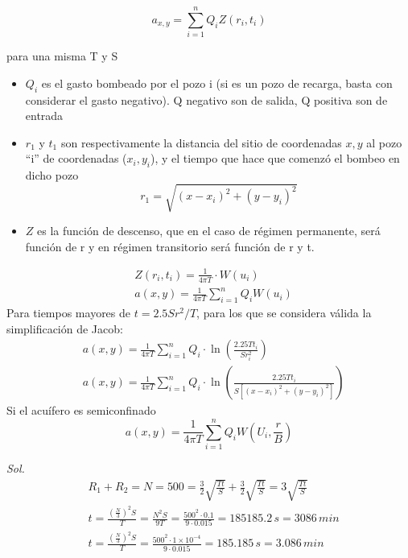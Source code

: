 \begin{equation}
    a_{x,y}= \sum_{i = 1}^{n} Q_iZ\left(r_i,t_i\right)
\end{equation}
\begin{notation}
    para una misma T y S \begin{itemize}
        \item $Q_i$ es el gasto bombeado por el pozo i (si es un pozo de recarga, basta con considerar el gasto negativo). Q negativo son de salida, Q positiva son de entrada 
        \item $r_1$ y $t_1$ son respectivamente la distancia del sitio de coordenadas $x,y$ al pozo ``i'' de coordenadas ($x_i,y_i$), y el tiempo que hace que comenzó el bombeo en dicho pozo
        \begin{equation}
            r_1= \sqrt{\left(x - x_i\right)^2 + \left(y - y_i\right)^2}
        \end{equation}
        \item $Z$ es la función de descenso, que en el caso de régimen permanente, será función de r y en régimen transitorio será función de r y t.
    \end{itemize}
\end{notation}
\begin{align*}
    &Z\left(r_i, t_i\right) = \frac{1}{4 \pi T} \cdot W(u_i)\\
    &a(x,y)= \frac{1}{4\pi T} \sum_{i = 1}^n Q_iW(u_i)
\end{align*}
Para tiempos mayores de $t=2.5Sr^2 /T$, para los que se considera válida la simplificación de Jacob:
\begin{align*}
    &a(x,y)= \frac{1}{4\pi T} \sum_{i = 1}^n Q_i \cdot \ln{\left(\frac{2.25Tt_i}{Sr_i^2}\right)}\\
    &a(x,y)= \frac{1}{4\pi T} \sum_{i = 1}^n Q_i \cdot  \ln{\left(\frac{2.25Tt_i}{S\left[\left(x - x_i\right)^2 + \left(y - y_i\right)^2\right]}\right)}
\end{align*}
Si el acuífero es semiconfinado 
\begin{equation}
    a(x,y)= \frac{1}{4\pi T} \sum_{i = 1}^n Q_i W\left(U_i, \frac{r}{B}\right)
\end{equation}
\begin{problem}[Determinar el tiempo en el que se alcanzan dos conos de abatimiento de dos pozos separados $500m$, en: a) un acuífero libre de $S= 0.1$ y $T= 0.015 m^2/s$, iniciando su operación al mismo tiempo, b) en un acuífero confinado de $S= 1x10^{-4}$ y la misma transmisividad.]
    \textit{ Sol. }
    \begin{align*}
        &R_1+ R_2= N = 500 = \frac{3}{2} \sqrt{\frac{Tt}{S}} + \frac{3}{2} \sqrt{\frac{Tt}{S}} = 3 \sqrt{\frac{Tt}{S}}\\
        &t = \frac{\left(\frac{N}{3}\right)^2S}{T} = \frac{N^2S}{9T} = \frac{500^2 \cdot 0.1}{9 \cdot 0.015} = 185185.2\,s = 3086\,min\\
        & t = \frac{\left(\frac{N}{3}\right)^2S}{T} = \frac{500^2 \cdot 1 \times 10^{ -4}}{9 \cdot 0.015} = 185.185\,s = 3.086\,min\\
    \end{align*}
\end{problem}
